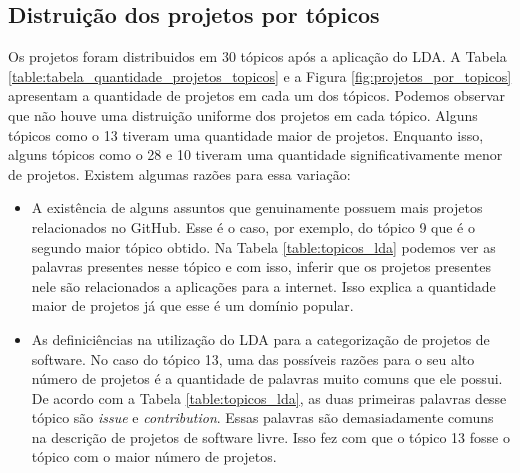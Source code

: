 \subsection{Distruição dos projetos por tópicos}


Os projetos foram distribuidos em 30 tópicos após a aplicação do LDA. A Tabela \ref{table:tabela_quantidade_projetos_topicos} e a Figura \ref{fig:projetos_por_topicos} apresentam a quantidade de projetos em cada um dos tópicos. Podemos observar que não houve uma distruição uniforme dos projetos em cada tópico. Alguns tópicos como o 13 tiveram uma quantidade maior de projetos. Enquanto isso, alguns tópicos como o 28 e 10 tiveram uma quantidade significativamente menor de projetos. Existem algumas razões para essa variação:

\begin{itemize}
\item A existência de alguns assuntos que genuinamente possuem mais projetos relacionados no GitHub. Esse é o caso, por exemplo, do tópico 9 que é o segundo maior tópico obtido. Na Tabela \ref{table:topicos_lda} podemos ver as palavras presentes nesse tópico e com isso, inferir que os projetos presentes nele são relacionados a aplicações para a internet. Isso explica a quantidade maior de projetos já que esse é um domínio popular. 
\item As definiciências na utilização do LDA para a categorização de projetos de software. No caso do tópico 13, uma das possíveis razões para o seu alto número de projetos é a quantidade de palavras muito comuns que ele possui. De acordo com a Tabela \ref{table:topicos_lda}, as duas primeiras palavras desse tópico são \textit{issue} e \textit{contribution}. Essas palavras são demasiadamente comuns na descrição de projetos de software livre. Isso fez com que o tópico 13 fosse o tópico com o maior número de projetos.
\end{itemize} 


